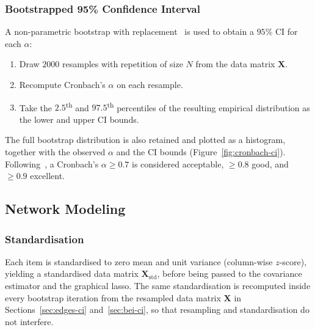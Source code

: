 \documentclass{article}
\begin{document}
\subsubsection{Bootstrapped 95\% Confidence Interval}
\label{sec:cronbach-ci}
A non-parametric bootstrap with replacement~\parencite{efron1979bootstrap}
is used to obtain a $95\%$ CI for each $\alpha$:
\begin{enumerate}
    \item Draw $2000$ resamples with repetition of size $N$ from the data
        matrix $\mathbf{X}$.
    \item Recompute Cronbach's $\alpha$ on each resample.
    \item Take the $2.5$\textsuperscript{th} and
        $97.5$\textsuperscript{th} percentiles of the resulting empirical
        distribution as the lower and upper CI bounds.
\end{enumerate}
The full bootstrap distribution is also retained and plotted as a histogram, together with the observed $\alpha$ and the CI bounds (Figure~\ref{fig:cronbach-ci}). Following~\textcite{george2003spss}, a Cronbach's $\alpha \geq 0.7$ is
considered acceptable, $\geq 0.8$ good, and $\geq 0.9$ excellent.

\subsection{Network Modeling}

\subsubsection{Standardisation}
Each item is standardised to zero mean and unit variance (column-wise
$z$-score), yielding a standardised data matrix
$\mathbf{X}_{\text{std}}$, before being passed to the covariance
estimator and the graphical lasso. The same standardisation is
recomputed inside every bootstrap iteration from the resampled data
matrix $\mathbf{X}$ in Sections~\ref{sec:edges-ci}
and~\ref{sec:bei-ci}, so that resampling and standardisation do not
interfere.
\end{document}
